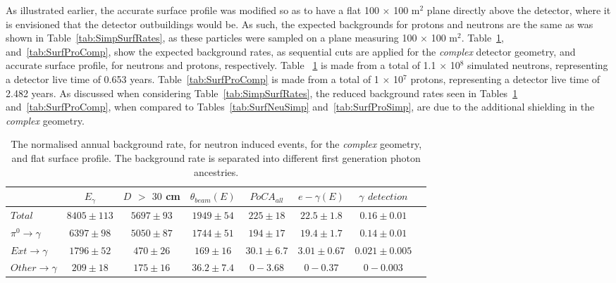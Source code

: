 As illustrated earlier, the accurate surface profile was modified so as to have a flat 100 $\times$ 100 m$^{2}$ plane directly above the detector, where it is envisioned that the detector outbuildings would be. As such, the expected backgrounds for protons and neutrons are the same as was shown in Table~\ref{tab:SimpSurfRates}, as these particles were sampled on a plane measuring 100 $\times$ 100 m$^{2}$. Table~\ref{tab:SurfNeuComp}, and~\ref{tab:SurfProComp}, show the expected background rates, as sequential cuts are applied for the \emph{complex} detector geometry, and accurate surface profile, for neutrons and protons, respectively. Table ~\ref{tab:SurfNeuComp} is made from a total of 1.1 $\times$ 10$^8$ simulated neutrons, representing a detector live time of 0.653 years. Table~\ref{tab:SurfProComp} is made from a total of 1 $\times$ 10$^7$ protons, representing a detector live time of 2.482 years. As discussed when considering Table~\ref{tab:SimpSurfRates}, the reduced background rates seen in Tables~\ref{tab:SurfNeuComp} and~\ref{tab:SurfProComp}, when compared to Tables~\ref{tab:SurfNeuSimp} and~\ref{tab:SurfProSimp}, are due to the additional shielding in the \emph{complex} geometry. \\

\begin{table}
  \caption[The normalised annual background rate, for neutron induced events, for the \emph{complex} geometry, and flat surface profile]
          {The normalised annual background rate, for neutron induced events, for the \emph{complex} geometry, and flat surface profile. The background rate is separated into different first generation photon ancestries.}
  \label{tab:SurfNeuComp}
  \centering
  \scriptsize
  \begin{tabular}{l c c c c c c c }
    \toprule
        & $E_\gamma$ &  $D$ $>$ $30$ cm & $\theta_{beam}(E)$ & $PoCA_{all}$ & $e-\gamma(E)$ & $\gamma$ $detection$ \\
        \midrule
        $Total$          & $8405\pm113$ & $5697\pm93$ & $1949\pm54$  & $225\pm18$   & $22.5\pm1.8$  & $0.16\pm0.01$ \\

        $\pi^0\to\gamma$ & $6397\pm98$  & $5050\pm87$ & $1744\pm51$  & $194\pm17$   & $19.4\pm1.7$  & $0.14\pm0.01$ \\

        $Ext\to\gamma$   & $1796\pm52$  & $470\pm26$  & $169\pm16$   & $30.1\pm6.7$ & $3.01\pm0.67$ & $0.021\pm0.005$ \\

        $Other\to\gamma$ & $209\pm18$   & $175\pm16$  & $36.2\pm7.4$ & $0-3.68$     & $0-0.37$      & $0-0.003$ \\
        \bottomrule
  \end{tabular}
\end{table}

